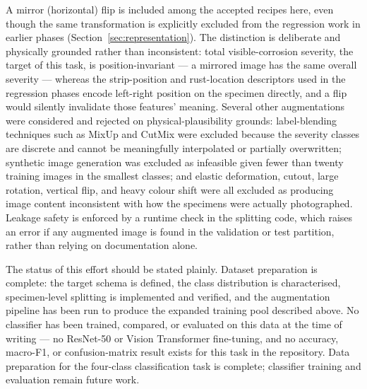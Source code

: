 A mirror (horizontal) flip is included among the accepted recipes here,
even though the same transformation is explicitly excluded from the
regression work in earlier phases (Section~\ref{sec:representation}). The
distinction is deliberate and physically grounded rather than
inconsistent: total visible-corrosion severity, the target of this task, is
position-invariant — a mirrored image has the same overall severity — whereas
the strip-position and rust-location descriptors used in the regression
phases encode left-right position on the specimen directly, and a flip
would silently invalidate those features' meaning. Several other
augmentations were considered and rejected on physical-plausibility
grounds: label-blending techniques such as MixUp and CutMix were excluded
because the severity classes are discrete and cannot be meaningfully
interpolated or partially overwritten; synthetic image generation was
excluded as infeasible given fewer than twenty training images in the
smallest classes; and elastic deformation, cutout, large rotation, vertical
flip, and heavy colour shift were all excluded as producing image content
inconsistent with how the specimens were actually photographed. Leakage
safety is enforced by a runtime check in the splitting code, which raises
an error if any augmented image is found in the validation or test
partition, rather than relying on documentation alone.

The status of this effort should be stated plainly. Dataset preparation is
complete: the target schema is defined, the class distribution is
characterised, specimen-level splitting is implemented and verified, and
the augmentation pipeline has been run to produce the expanded training
pool described above. No classifier has been trained, compared, or
evaluated on this data at the time of writing — no ResNet-50 or Vision
Transformer fine-tuning, and no accuracy, macro-F1, or confusion-matrix
result exists for this task in the repository. Data preparation for the
four-class classification task is complete; classifier training and
evaluation remain future work.

